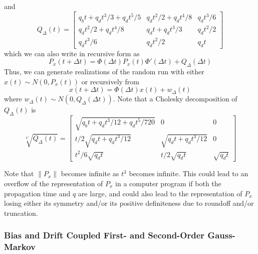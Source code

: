 and
\begin{equation}
	Q_\Delta(t) = \begin{bmatrix}
	q_b t + q_d t^3/3 + q_{\dot{d}} t^5/5 &
	q_d t^2/2 + q_{\dot{d}} t^4/8 &
	q_{\dot{d}}t^3/6 \\
	q_d t^2/2 + q_{\dot{d}} t^4/8 &
	q_d t + q_{\dot{d}} t^3/3 &
	q_{\dot{d}}t^2/2 \\
	q_{\dot{d}}t^3/6 & q_{\dot{d}}t^2/2 &  q_{\dot{d}} t
	\end{bmatrix}
\end{equation}
which we can also write in recursive form as
\begin{equation}
	P_x(t+\Delta t) = \Phi(\Delta t)P_x(t)\Phi'(\Delta t) + Q_\Delta(\Delta t)
\end{equation}
Thus, we can generate realizations of the random run with either $x(t) \sim N(0, P_x(t))$ or recursively from
\begin{equation}
	x(t+\Delta t) = \Phi(\Delta t) x(t) + w_\Delta(t)
\end{equation}
where $w_\Delta(t) \sim N(0, Q_\Delta(\Delta t))$.  Note that a Cholesky decomposition of $Q_\Delta(t)$ is
\begin{equation}
	\sqrt[C]{Q_\Delta(t)} = \begin{bmatrix}
	\sqrt{q_b t + q_d t^3/12 + q_{\dot{d}}t^5/720} & 0 & 0 \\
	t/2\sqrt{q_d t + q_{\dot{d}}t^3/12} & \sqrt{q_d t + q_{\dot{d}}t^3/12} & 0 \\
	t^2/6\sqrt{q_{\dot{d}}t} & t/2\sqrt{q_{\dot{d}}t} &
	\sqrt{q_{\dot{d}} t}
	\end{bmatrix}
\end{equation}

Note that $\|P_x\|$ becomes infinite as $t^3$ becomes infinite.  This could lead to an overflow of the representation of $P_x$ in a computer program if both the propagation time and $q$ are large, and could also lead to the representation of $P_x$ losing either its symmetry and/or its positive definiteness due to roundoff and/or truncation.

\subsubsection{Bias and Drift Coupled First- and Second-Order Gauss-Markov}

